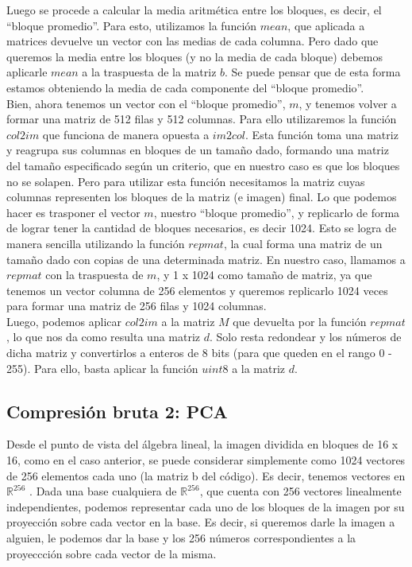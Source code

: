 \documentclass[twocolumn,a4paper,10pt]{article}
\begin{document}
Luego se procede a calcular la media aritm\'etica entre los bloques, es decir, el ``bloque promedio''. Para esto, utilizamos la funci\'on $mean$, que aplicada a 
matrices devuelve un vector con las medias de cada columna. Pero dado que queremos la media entre los bloques (y no la media de cada bloque) debemos aplicarle
$mean$ a la traspuesta de la matriz $b$. Se puede pensar que de esta forma estamos obteniendo la media de cada componente del ``bloque promedio''. \\

Bien, ahora tenemos un vector con el ``bloque promedio'', $m$, y tenemos volver a formar una matriz de 512 filas y 512 columnas. Para ello utilizaremos la funci\'on
$col2im$ que funciona de manera opuesta a $im2col$. Esta funci\'on toma una matriz y reagrupa sus columnas en bloques de un tamaño dado, formando una matriz del 
tamaño especificado seg\'un un criterio, que en nuestro caso es que los bloques no se solapen. Pero para utilizar esta funci\'on necesitamos la matriz cuyas 
columnas representen los bloques de la matriz (e imagen) final. Lo que podemos hacer es trasponer el vector $m$, nuestro ``bloque promedio'', y replicarlo de forma
de lograr tener la cantidad de bloques necesarios, es decir 1024. Esto se logra de manera sencilla utilizando la funci\'on $repmat$, la cual forma una matriz de un
tamaño dado con copias de una determinada matriz. En nuestro caso, llamamos a $repmat$ con la traspuesta de $m$, y 1 x 1024 como tamaño de matriz, ya que tenemos un 
vector columna de 256 elementos y queremos replicarlo 1024 veces para formar una matriz de 256 filas y 1024 columnas.\\

Luego, podemos aplicar $col2im$ a la matriz $M$ que devuelta por la funci\'on $repmat$, lo que nos da como resulta una matriz $d$. Solo resta redondear y los n\'umeros 
de dicha matriz y convertirlos a enteros de 8 bits (para que queden en el rango 0 - 255). Para ello, basta aplicar la funci\'on $uint8$ a la matriz $d$.

\subsection{Compresi\'on bruta 2: PCA}

Desde el punto de vista del  \'algebra lineal, la imagen dividida en bloques de 16 x 16, como en el caso anterior, se puede considerar simplemente como
1024 vectores de 256 elementos cada uno (la matriz b del código). Es decir, tenemos vectores en $\mathbb{R}^{256}$ . Dada una base cualquiera de $\mathbb{R}^{256}$,
 que cuenta con 256 vectores linealmente independientes, podemos representar cada uno de los bloques de la imagen por su proyecci\'on sobre cada vector en la base. 
Es decir, si queremos darle la imagen a alguien, le podemos dar la base y los 256 n\'umeros correspondientes a la proyeccci\'on sobre cada vector de la misma. \\
\end{document}
